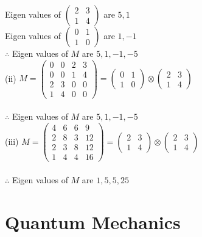 \documentclass{article}
\begin{document}
\noindent
Eigen values of $\begin{pmatrix}2 & 3\\ 1 & 4 \end{pmatrix}$ are $5,1$ \\
Eigen values of $\begin{pmatrix} 0 & 1\\ 1 & 0 \end{pmatrix}$ are $1,-1$\\

\noindent
$\therefore$ Eigen values of $M$ are $5,1,-1,-5$\\

\noindent
(ii) $M = \begin{pmatrix}
    0 & 0 & 2 & 3\\
    0 & 0 & 1 & 4\\
    2 & 3 & 0 & 0\\
    1 & 4 & 0 & 0
\end{pmatrix} = \begin{pmatrix} 0 & 1\\ 1 & 0 \end{pmatrix} \otimes \begin{pmatrix} 2 & 3\\ 1 & 4 \end{pmatrix}$\\\\

\noindent
$\therefore$ Eigen values of $M$ are $5,1,-1,-5$\\

\noindent
(iii) $M = \begin{pmatrix}
    4 & 6 & 6 & 9\\
    2 & 8 & 3 & 12\\
    2 & 3 & 8 & 12\\
    1 & 4 & 4 & 16
\end{pmatrix} = \begin{pmatrix} 2 & 3\\ 1 & 4 \end{pmatrix} \otimes \begin{pmatrix} 2 & 3\\ 1 & 4 \end{pmatrix}$\\\\

\noindent
$\therefore$ Eigen values of $M$ are $1,5,5,25$\\

\section{Quantum Mechanics}
\end{document}
